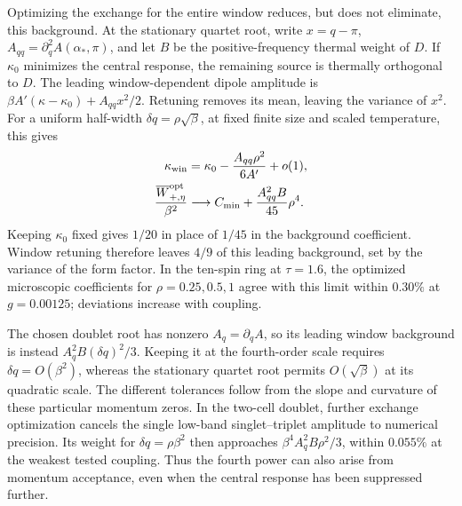 Optimizing the exchange for the entire window reduces, but does not
eliminate, this background. At the stationary quartet root, write
$x=q-\pi$, $A_{qq}=\partial_q^2 A(\alpha_*,\pi)$, and let $B$ be the
positive-frequency thermal weight of $D$. If $\kappa_0$ minimizes the
central response, the remaining source is thermally orthogonal to $D$.
The leading window-dependent dipole amplitude is
$\beta A'(\kappa-\kappa_0)+A_{qq}x^2/2$.
Retuning removes its mean, leaving the variance of $x^2$.
For a uniform half-width $\delta q=\rho\sqrt{\beta}$, at fixed finite
size and scaled temperature, this gives
\begin{align}
 \kappa_{\rm win}&=\kappa_0-\frac{A_{qq}\rho^2}{6A'}+o(1),\notag\\
 \frac{\overline W^{\rm opt}_{+,\eta}}{\beta^2}
 &\longrightarrow C_{\min}+\frac{A_{qq}^2B}{45}\rho^4.
 \label{eq:window-retuning}
\end{align}
Keeping $\kappa_0$ fixed gives $1/20$ in place of $1/45$ in the
background coefficient. Window retuning therefore leaves $4/9$ of this
leading background, set by the variance of the form factor.
In the ten-spin ring at $\tau=1.6$, the optimized microscopic
coefficients for $\rho=0.25,0.5,1$ agree with this limit within
$0.30\%$ at $g=0.00125$; deviations increase with coupling.

The chosen doublet root has nonzero $A_q=\partial_q A$, so its leading
window background is instead $A_q^2B(\delta q)^2/3$. Keeping it at
the fourth-order scale requires $\delta q=O(\beta^2)$, whereas the
stationary quartet root permits $O(\sqrt{\beta})$ at its quadratic
scale. The different tolerances follow from the slope and curvature
of these particular momentum zeros.
In the two-cell doublet, further exchange optimization cancels the
single low-band singlet--triplet amplitude to numerical precision.
Its weight for $\delta q=\rho\beta^2$ then approaches
$\beta^4 A_q^2B\rho^2/3$, within $0.055\%$ at the weakest tested coupling.
Thus the fourth power can also arise from momentum acceptance, even
when the central response has been suppressed further.
